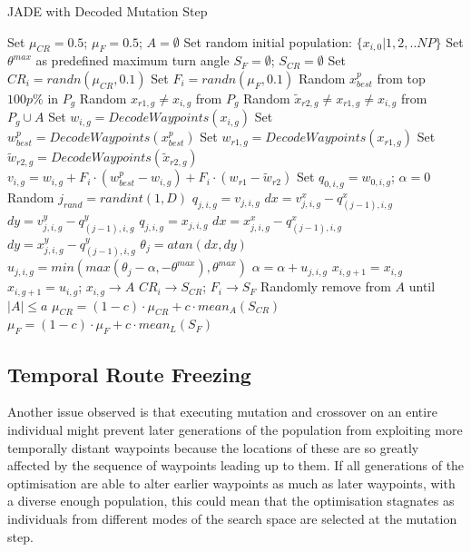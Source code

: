 \documentclass[10pt,a4paper, oneside, conference]{IEEEtran}
\begin{document}
	 \begin{algorithm}[h]
  \caption{JADE with Decoded Mutation Step}\label{algorithm:JADEwDecodingWaypoints}
  \begin{algorithmic}[1]
    \State Set $\mu_{CR}=0.5$; $\mu_{F}=0.5$; $A=\emptyset$
    \State Set random initial population: $ \{x_{i,0}|1,2,..NP \}$
    \State Set $\theta^{max}$ as predefined maximum turn angle
    \State $S_F=\emptyset$; $S_{CR}=\emptyset$
    \State Set $CR_i=randn(\mu_{CR},0.1)$
    \State Set $F_i=randn(\mu_{F},0.1)$
    \State Random $x_{best}^p$ from top $100p\%$ in $P_g$
    \State Random $x_{r1,g} \neq x_{i,g}$ from $P_g$
    \State Random $\widetilde{x}_{r2,g} \neq x_{r1,g} \neq x_{i,g}$ from $P_g \cup A$
    \State Set $w_{i,g}=DecodeWaypoints(x_{i,g})$
    \State Set $w_{best}^p=DecodeWaypoints(x_{best}^p)$
    \State Set $w_{r1,g}=DecodeWaypoints(x_{r1,g})$
    \State Set $\widetilde{w}_{r2,g}=DecodeWaypoints(\widetilde{x}_{r2,g})$
	\State $v_{i,g}=w_{i,g} + F_i \cdot (w^p_{best}-w_{i,g})+ F_i \cdot (w_{r1}-\widetilde{w}_{r2})$
	\State Set $q_{0,i,g}=w_{0,i,g}$; $\alpha=0$
	\State Random $j_{rand}=randint(1,D)$
	\State $q_{j,i,g} = v_{j,i,g}$
	\State $dx= v^x_{j,i,g}-q^x_{(j-1),i,g}$
	\State $dy= v^y_{j,i,g}-q^y_{(j-1),i,g}$
	\Else
	\State $q_{j,i,g} = x_{j,i,g}$
	\State $dx= x^x_{j,i,g}-q^x_{(j-1),i,g}$
	\State $dy= x^y_{j,i,g}-q^y_{(j-1),i,g}$
	\EndIf
	\State $\theta_j = atan(dx,dy)$
	\State $u_{j,i,g}=min(max(\theta_j-\alpha,-\theta^{max}),\theta^{max})$
	\State $\alpha = \alpha + u_{j,i,g}$
	\EndFor
	\State $x_{i,g+1}=x_{i,g}$
	\Else
	\State $x_{i,g+1}=u_{i,g}$; $x_{i,g} \rightarrow A$
	\State $CR_i \rightarrow S_{CR}$; $F_i \rightarrow S_F$
	\EndIf
    \EndFor
    \State Randomly remove from $A$ until $|A| \leq a$
    \State $\mu_{CR}=(1-c) \cdot \mu_{CR} + c \cdot mean_A(S_{CR})$
    \State $\mu_F=(1-c) \cdot \mu_F + c \cdot mean_L(S_F)$
    \EndFor
    \EndProcedure
  \end{algorithmic}
\end{algorithm}
	
	\subsection{Temporal Route Freezing}
	
	Another issue observed is that executing mutation and crossover on an entire individual might prevent later generations of the population from exploiting more temporally distant waypoints because the locations of these are so greatly affected by the sequence of waypoints leading up to them.
	If all generations of the optimisation are able to alter earlier waypoints as much as later waypoints, with a diverse enough population, this could mean that the optimisation stagnates as individuals from different modes of the search space are selected at the mutation step.
	
\end{document}
